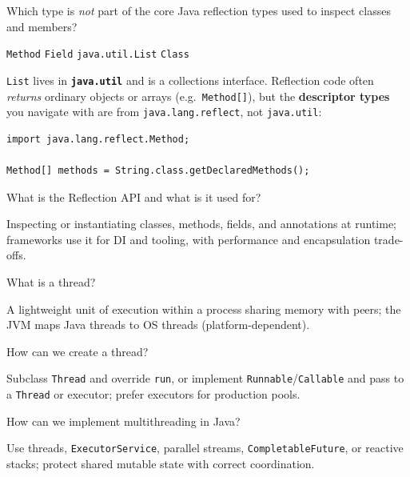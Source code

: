 \question[4]
Which type is \emph{not} part of the core Java reflection types used to inspect classes and members?
\begin{choices}
  \choice \texttt{Method}
  \choice \texttt{Field}
  \CorrectChoice \texttt{java.util.List}
  \choice \texttt{Class}
\end{choices}
\begin{solution}
  \texttt{List} lives in \textbf{\texttt{java.util}} and is a collections interface. Reflection code often \emph{returns} ordinary objects or arrays (e.g.\ \texttt{Method[]}), but the \textbf{descriptor types} you navigate with are from \texttt{java.lang.reflect}, not \texttt{java.util}:

\begin{lstlisting}[style=java]
import java.lang.reflect.Method;

Method[] methods = String.class.getDeclaredMethods();
\end{lstlisting}
\end{solution}

\question[4]
What is the Reflection API and what is it used for?
\begin{solutionorbox}[1.35in]
  Inspecting or instantiating classes, methods, fields, and annotations at runtime; frameworks use it for DI and tooling, with performance and encapsulation trade-offs.
\end{solutionorbox}

\newpage


\question[4]
What is a thread?
\begin{solutionorbox}[1in]
  A lightweight unit of execution within a process sharing memory with peers; the JVM maps Java threads to OS threads (platform-dependent).
\end{solutionorbox}

\question[4]
How can we create a thread?
\begin{solutionorbox}[1.2in]
  Subclass \texttt{Thread} and override \texttt{run}, or implement \texttt{Runnable}/\texttt{Callable} and pass to a \texttt{Thread} or executor; prefer executors for production pools.
\end{solutionorbox}

\question[4]
How can we implement multithreading in Java?
\begin{solutionorbox}[1.25in]
  Use threads, \texttt{ExecutorService}, parallel streams, \texttt{CompletableFuture}, or reactive stacks; protect shared mutable state with correct coordination.
\end{solutionorbox}

